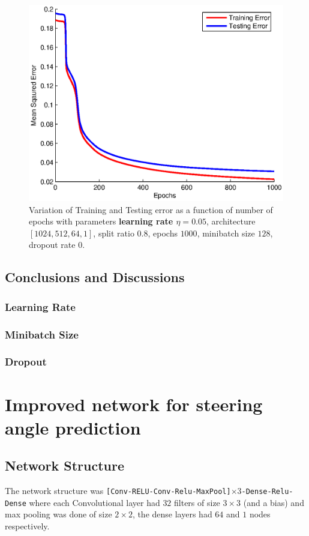 \documentclass{article}
\newcommand{\myScale}{0.56}
\begin{document}
\begin{figure}[H]
\includegraphics[scale=\myScale]{../q2/part4_0p05}
\caption{Variation of Training and Testing error as a function of number of epochs with parameters {\bf learning rate $\eta=0.05$}, architecture $[1024,512,64,1]$, split ratio $0.8$, epochs $1000$, minibatch size $128$, dropout rate $0$.}
\label{fig:fig22}
\end{figure}
\subsection{Conclusions and Discussions}
\subsubsection{Learning Rate}
\subsubsection{Minibatch Size}
\subsubsection{Dropout}
\section{Improved network for steering angle prediction}
\subsection{Network Structure}
The network structure was \verb|[Conv-RELU-Conv-Relu-MaxPool]|$\times 3$\verb|-Dense-Relu-Dense|
where each Convolutional layer had $32$ filters of size $3\times3$ (and a bias) and max pooling was done of size $2\times2$, the dense layers had $64$ and $1$ nodes respectively.
\end{document}
